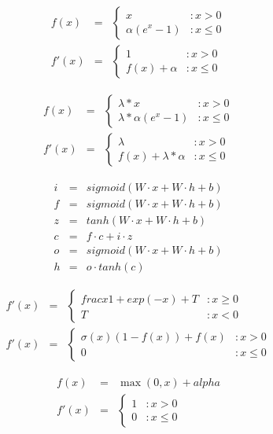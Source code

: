 \documentclass{article}
\begin{document}
\begin{eqnarray*} f(x) &=& \left\{ \begin{array}{lr} x & : x > 0 \\ \alpha(e^x - 1) & : x \le 0 \end{array} \right. \\ f'(x) &=& \left\{ \begin{array}{lr} 1 & : x > 0 \\ f(x) + \alpha & : x \le 0 \end{array} \right. \end{eqnarray*}
\pagebreak

\begin{eqnarray*} f(x) &=& \left\{ \begin{array}{lr} \lambda * x & : x > 0 \\ \lambda * \alpha(e^x - 1) & : x \le 0 \end{array} \right. \\ f'(x) &=& \left\{ \begin{array}{lr} \lambda & : x > 0 \\ f(x) + \lambda * \alpha & : x \le 0 \end{array} \right. \end{eqnarray*}
\pagebreak

\begin{eqnarray} i &=& sigmoid(W \cdot x + W \cdot h + b) \\ f &=& sigmoid(W \cdot x + W \cdot h + b) \\ z &=& tanh(W \cdot x + W \cdot h + b) \\ c &=& f \cdot c + i \cdot z \\ o &=& sigmoid(W \cdot x + W \cdot h + b) \\ h &=& o \cdot tanh(c) \end{eqnarray}
\pagebreak

\begin{eqnarray*} f'(x) &=& \left\{ \begin{array}{lr} frac{x}{1+exp(-x)} + T & : x \ge 0 \\ T & : x < 0 \end{array} \right. \\ f'(x) &=& \left\{ \begin{array}{lr} \sigma(x)(1 - f(x)) + f(x) & : x > 0 \\ 0 & : x \le 0 \end{array} \right. \end{eqnarray*}
\pagebreak

\begin{eqnarray*} f(x) &=& \max(0,x)+alpha \\ f'(x) &=& \left\{ \begin{array}{lr} 1 & : x > 0 \\ 0 & : x \le 0 \end{array} \right. \end{eqnarray*}
\pagebreak
\end{document}

